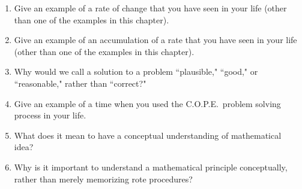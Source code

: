 \begin{enumerate}

    \item Give an example of a rate of change that you have seen in your life (other than one of the examples in this chapter).

    \item Give an example of an accumulation of a rate that you have seen in your life (other than one of the examples in this chapter).

    \item Why would we call a solution to a problem ``plausible," ``good," or ``reasonable," rather than ``correct?"

    \item Give an example of a time when you used the C.O.P.E.\ problem solving process in your life.

    \item What does it mean to have a conceptual understanding of mathematical idea?

    \item Why is it important to understand a mathematical principle conceptually, rather than merely memorizing rote procedures?

\end{enumerate}

%
